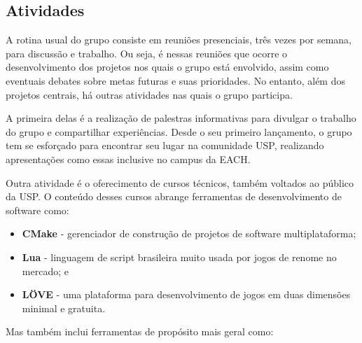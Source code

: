 \documentclass[12pt,onecolumn,a4paper]{article}
\begin{document}
    \subsection{Atividades}
        A rotina usual do grupo consiste em reuniões presenciais, três vezes por semana, para
        discussão e trabalho. Ou seja, é nessas reuniões que ocorre o desenvolvimento dos projetos
        nos quais o grupo está envolvido, assim como eventuais debates sobre metas futuras e suas
        prioridades. No entanto, além dos projetos centrais, há outras atividades nas quais o grupo
        participa.
        
        A primeira delas é a realização de palestras informativas para divulgar o trabalho do grupo
        e compartilhar experiências. Desde o seu primeiro lançamento, o grupo tem se esforçado para
        encontrar seu lugar na comunidade USP, realizando apresentações como essas inclusive no
        campus da EACH.
        
        Outra atividade é o oferecimento de cursos técnicos, também voltados ao público da USP. O
        conteúdo desses cursos abrange ferramentas de desenvolvimento de software como:

        \begin{itemize}
        
            \item{\bf CMake \footnotemark} - gerenciador de construção de projetos de software
                                             multiplataforma;
            
            \item {\bf Lua \footnotemark} - linguagem de script brasileira muito usada por jogos de
                                            renome no mercado; e

            \item {\bf LÖVE \footnotemark} - uma plataforma para desenvolvimento de jogos em duas
                                             dimensões minimal e gratuita.
            
        \end{itemize}
        
        Mas também inclui ferramentas de propósito mais geral como:
        
\end{document}
